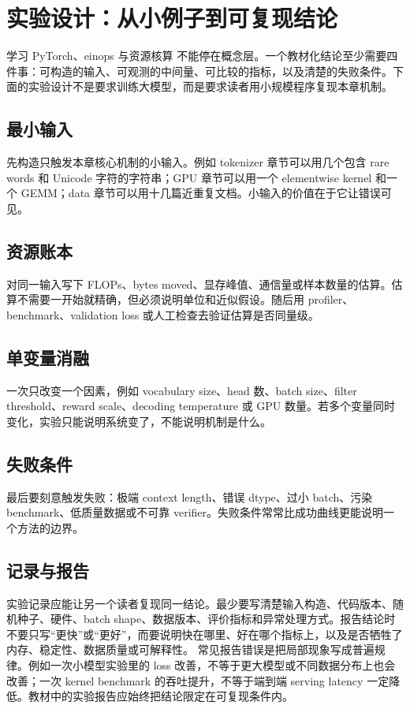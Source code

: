 \documentclass[a4paper]{article}
\begin{document}
\section{实验设计：从小例子到可复现结论}
学习 PyTorch、einops 与资源核算 不能停在概念层。一个教材化结论至少需要四件事：可构造的输入、可观测的中间量、可比较的指标，以及清楚的失败条件。下面的实验设计不是要求训练大模型，而是要求读者用小规模程序复现本章机制。
\subsection{最小输入}
先构造只触发本章核心机制的小输入。例如 tokenizer 章节可以用几个包含 rare words 和 Unicode 字符的字符串；GPU 章节可以用一个 elementwise kernel 和一个 GEMM；data 章节可以用十几篇近重复文档。小输入的价值在于它让错误可见。
\subsection{资源账本}
对同一输入写下 FLOPs、bytes moved、显存峰值、通信量或样本数量的估算。估算不需要一开始就精确，但必须说明单位和近似假设。随后用 profiler、benchmark、validation loss 或人工检查去验证估算是否同量级。
\subsection{单变量消融}
一次只改变一个因素，例如 vocabulary size、head 数、batch size、filter threshold、reward scale、decoding temperature 或 GPU 数量。若多个变量同时变化，实验只能说明系统变了，不能说明机制是什么。
\subsection{失败条件}
最后要刻意触发失败：极端 context length、错误 dtype、过小 batch、污染 benchmark、低质量数据或不可靠 verifier。失败条件常常比成功曲线更能说明一个方法的边界。
\subsection{记录与报告}
实验记录应能让另一个读者复现同一结论。最少要写清楚输入构造、代码版本、随机种子、硬件、batch shape、数据版本、评价指标和异常处理方式。报告结论时不要只写“更快”或“更好”，而要说明快在哪里、好在哪个指标上，以及是否牺牲了内存、稳定性、数据质量或可解释性。
常见报告错误是把局部现象写成普遍规律。例如一次小模型实验里的 loss 改善，不等于更大模型或不同数据分布上也会改善；一次 kernel benchmark 的吞吐提升，不等于端到端 serving latency 一定降低。教材中的实验报告应始终把结论限定在可复现条件内。
\end{document}
